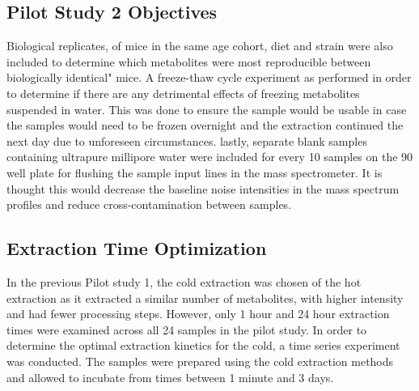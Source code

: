 \documentclass[a4paper,11pt,twoside]{book}
\begin{document}
	\subsection*{Pilot Study 2 Objectives}
	 
    Biological replicates, of mice in the same age cohort, diet and strain were also included to determine which metabolites were most reproducible between biologically identical" mice.  A freeze-thaw cycle experiment as performed in order to determine if there are any detrimental effects of freezing metabolites suspended in water. This was done to ensure the sample would be usable in case the samples would need to be frozen overnight and the extraction continued the next day due to unforeseen circumstances. lastly, separate blank samples containing ultrapure millipore water were included for every 10 samples on the 90 well plate for flushing the sample input lines in the mass spectrometer. It is thought this would decrease the baseline noise intensities in the mass spectrum profiles and reduce cross-contamination between samples.
	
	\subsection*{Extraction Time Optimization}
	
    In the previous Pilot study 1, the cold extraction was chosen of the hot extraction as it extracted a similar number of metabolites, with higher intensity and had fewer processing steps. However, only 1 hour and 24 hour extraction times were examined across all 24 samples in the pilot study. In order to determine the optimal extraction kinetics for the cold, a time series experiment was conducted. The samples were prepared using the cold extraction methods and allowed to incubate from times between 1 minute and 3 days.
	
\end{document}
